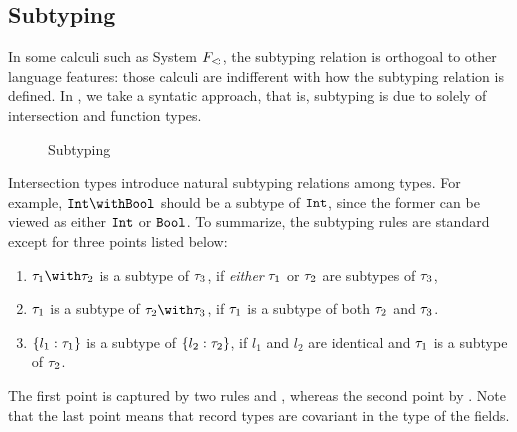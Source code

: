 \subsection{Subtyping}




In some calculi such as System $ F_{<\!:} $, the subtyping relation is
orthogoal to other language features: those calculi are indifferent with how the
subtyping relation is defined. In \name, we take a syntatic approach, that is,
subtyping is due to solely of intersection and function types.

\begin{figure}

\caption{Subtyping}
\end{figure}


Intersection types introduce natural subtyping relations among types. For
example, $ \Int \intersects \Bool $ should be a subtype of $ \texttt{Int} $, since the
former can be viewed as either $ \texttt{Int} $ or $ \texttt{Bool} $. To summarize, the
subtyping rules are standard except for three points listed below:
\begin{enumerate}
\item $ \ty_1 \intersects \ty_2 $ is a subtype of $ \tau_3 $, if \emph{either} $ \tau_1 $ or
  $ \tau_2 $ are subtypes of $ \tau_3 $,

\item $ \tau_1 $ is a subtype of $ \ty_2 \intersects \ty_3 $, if $ \tau_1 $ is a subtype of
  both $ \tau_2 $ and $ \tau_3 $.

\item $ \{ l_1 : \tau_1 \} $ is a subtype of $ \{ l_2 : \tau_2 \} $, if
  $ l_1 $ and $ l_2 $ are identical and $ \tau_1 $ is a subtype of $ \tau_2 $.
\end{enumerate}
The first point is captured by two rules  and
, whereas the second point by . Note that the
last point means that record types are covariant in the type of the fields.

